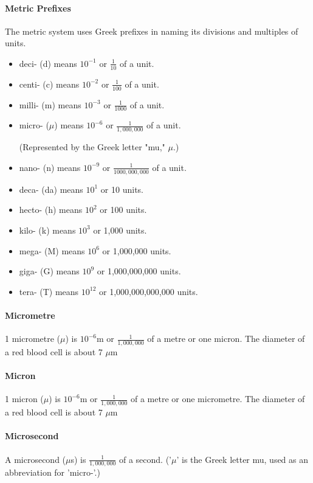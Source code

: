 \documentclass[12pt]{article}
\begin{document}
\paragraph{Metric Prefixes}
The metric system uses Greek prefixes in naming its divisions and multiples of units.
\begin{itemize}
\item deci- (d)  means $10^{-1}$ or $\frac{1}{10}$ of a unit.
\item centi- (c) means $10^{-2}$ or $\frac{1}{100}$ of a unit.
\item milli- (m) means $10^{-3}$ or $\frac{1}{1000}$ of a unit.
\item micro- ($\mu$) means $10^{-6}$ or $\frac{1}{1,000,000}$ of a unit.

(Represented by the Greek letter "mu," $\mu$.)
\item nano- (n) means $10^{-9}$ or $\frac{1}{1000,000,000}$ of a unit.
\item deca- (da) means $10^1$ or 10 units.
\item hecto- (h) means $10^2$ or 100 units.
\item kilo- (k) means $10^3$ or 1,000 units.
\item mega- (M) means $10^6$ or 1,000,000 units.
\item giga- (G) means $10^9$ or 1,000,000,000 units.
\item tera- (T) means $10^{12}$ or 1,000,000,000,000 units.
\end{itemize}

\paragraph{Micrometre} 1 micrometre ($\mu$) is $10^{-6}$m or $\frac{1}{1,000,000}$ of a metre or one micron. The diameter of a red blood cell is about 7 $\mu$m

\paragraph{Micron} 1 micron ($\mu$) is $10^{-6}$m or $\frac{1}{1,000,000}$ of a metre or one micrometre. The diameter of a red blood cell is about 7 $\mu$m

\paragraph{Microsecond}
A microsecond ($\mu$s) is $\frac{1}{1,000,000}$ of a second. ('$\mu$' is the Greek letter mu, used as an abbreviation for 'micro-'.)
\end{document}
